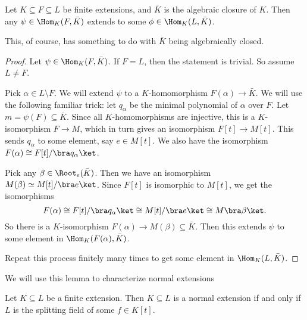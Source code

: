 \documentclass[a4paper]{article}
\begin{document}
\begin{lemma}
  Let $K\subseteq F \subseteq L$ be finite extensions, and $\bar K$ is the algebraic closure of $K$. Then any $\psi \in \Hom_K(F, \bar K)$ extends to some $\phi \in \Hom_K(L, \bar K)$.
\end{lemma}
This, of course, has something to do with $\bar K$ being algebraically closed.

\begin{proof}
  Let $\psi \in \Hom_K(F, \bar K)$. If $F = L$, then the statement is trivial. So assume $L \not= F$.

  Pick $\alpha \in L\setminus F$. We will extend $\psi$ to a $K$-homomorphism $F(\alpha) \to \bar K$. We will use the following familiar trick: let $q_\alpha$ be the minimal polynomial of $\alpha$ over $F$. Let $m = \psi(F)\subseteq \bar K$. Since all $K$-homomorphisms are injective, this is a $K$-isomorphism $F \to M$, which in turn gives an isomorphism $F[t] \to M[t]$. This sends $q_\alpha$ to some element, say $e \in M[t]$. We also have the isomorphism $F(\alpha) \cong F[t]/\bra q_\alpha\ket$.

  Pick any $\beta \in \Root_e (\bar K)$. Then we have an isomorphism $M(\beta) \simeq M[t]/\bra e \ket$. Since $F[t]$ is isomorphic to $M[t]$, we get the isomorphisms
  \[
    F(\alpha) \cong F[t]/\bra q_\alpha\ket \cong M[t]/\bra e\ket \cong M\bra \beta\ket.
  \]
  So there is a $K$-isomorphism $F(\alpha) \to M(\beta)\subseteq \bar{K}$. Then this extends $\psi$ to some element in $\Hom_K(F(\alpha), \bar K)$.

  Repeat this process finitely many times to get some element in $\Hom_K(L, \bar{K})$.
\end{proof}
We will use this lemma to characterize normal extensions

\begin{thm}
  Let $K\subseteq L$ be a finite extension. Then $K\subseteq L$ is a normal extension if and only if $L$ is the splitting field of some $f \in K[t]$.
\end{thm}
\end{document}
